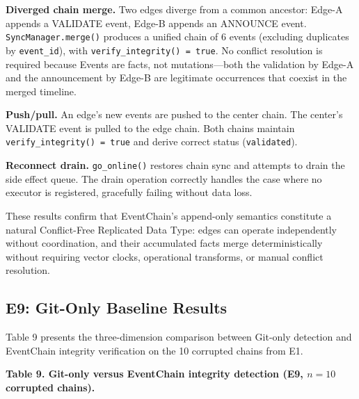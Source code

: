 \textbf{Diverged chain merge.} Two edges diverge from a common ancestor: Edge-A appends a VALIDATE event, Edge-B appends an ANNOUNCE event. \texttt{SyncManager.merge()} produces a unified chain of 6 events (excluding duplicates by \texttt{event\_id}), with \texttt{verify\_integrity()\ =\ true}. No conflict resolution is required because Events are facts, not mutations---both the validation by Edge-A and the announcement by Edge-B are legitimate occurrences that coexist in the merged timeline.

\textbf{Push/pull.} An edge's new events are pushed to the center chain. The center's VALIDATE event is pulled to the edge chain. Both chains maintain \texttt{verify\_integrity()\ =\ true} and derive correct status (\texttt{validated}).

\textbf{Reconnect drain.} \texttt{go\_online()} restores chain sync and attempts to drain the side effect queue. The drain operation correctly handles the case where no executor is registered, gracefully failing without data loss.

These results confirm that EventChain's append-only semantics constitute a natural Conflict-Free Replicated Data Type: edges can operate independently without coordination, and their accumulated facts merge deterministically without requiring vector clocks, operational transforms, or manual conflict resolution.

\subsection{E9: Git-Only Baseline Results}\label{e9-git-only-baseline-results}

Table 9 presents the three-dimension comparison between Git-only detection and EventChain integrity verification on the 10 corrupted chains from E1.

\textbf{Table 9. Git-only versus EventChain integrity detection (E9, \(n=10\) corrupted chains).}

